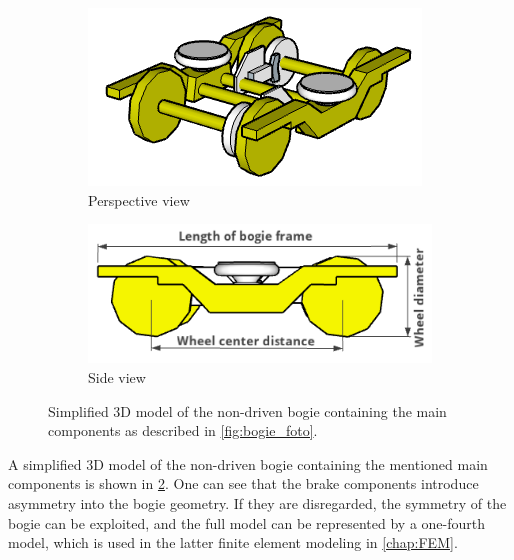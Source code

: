 \begin{figure}[H]
	\centering
	\begin{subfigure}[b]{0.48\textwidth}
		\centering
		\includegraphics{fig/running_bogie_sketchup.PNG}
		\caption{Perspective view}
	\end{subfigure}
	\begin{subfigure}[b]{0.48\textwidth}
		\centering
		\includegraphics[width=\linewidth]{fig/running_bogie_sideview_with_labels.PNG}
		\caption{Side view}
		\label{fig:bogie_side_view}
	\end{subfigure}
	\label{fig:bogie_3d_model}
	\caption{Simplified 3D model of the non-driven bogie containing the main components as described in \cref{fig:bogie_foto}.}
\end{figure}

A simplified 3D model of the non-driven bogie containing the mentioned main components is shown in \cref{fig:bogie_3d_model}. One can see that the brake components introduce asymmetry into the bogie geometry. If they are disregarded, the symmetry of the bogie can be exploited, and the full model can be represented by a one-fourth model, which is used in the latter finite element modeling in \cref{chap:FEM}.

